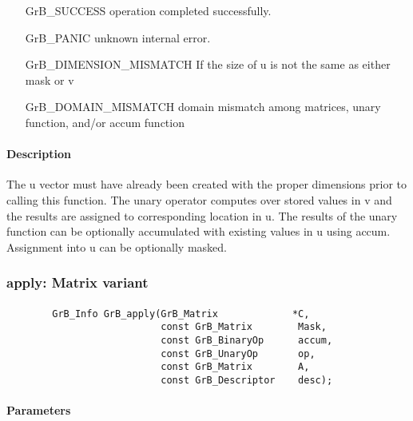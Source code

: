 \begin{itemize}[leftmargin=2.1in]
\item[{\sf GrB\_SUCCESS}]     operation completed successfully.
\item[{\sf GrB\_PANIC}]        unknown internal error.
\item[{\sf GrB\_DIMENSION\_MISMATCH}]            
        If the size of {\sf u} is not the same as either {\sf mask} or {\sf v}
\item[{\sf GrB\_DOMAIN\_MISMATCH}]  
        domain mismatch among matrices, unary function, and/or
        accum function 
\end{itemize}

\paragraph{Description}

The {\sf u} vector must have already been created with the proper dimensions
prior to calling this function.  The unary operator computes over stored values in {\sf v} and the results are assigned to corresponding location in {\sf u}.
The results of the unary function can be optionally accumulated with existing values in {\sf u} using {\sf accum}.  Assignment into {\sf u} can be optionally masked.


\subsubsection{{\sf apply}: Matrix variant}

\paragraph{\syntax}

\begin{verbatim}
        GrB_Info GrB_apply(GrB_Matrix             *C,
                           const GrB_Matrix        Mask,
                           const GrB_BinaryOp      accum,
                           const GrB_UnaryOp       op,
                           const GrB_Matrix        A,
                           const GrB_Descriptor    desc);
\end{verbatim}

\paragraph{Parameters}

